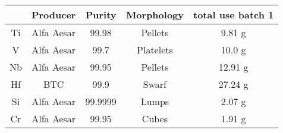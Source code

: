 \begin{tabular}{ccccc}
\toprule
{} &    Producer &   Purity & Morphology & total use batch 1 \\
\midrule
Ti &  Alfa Aesar &    99.98 &    Pellets &            9.81 g \\
V  &  Alfa Aesar &     99.7 &  Platelets &            10.0 g \\
Nb &  Alfa Aesar &    99.95 &    Pellets &           12.91 g \\
Hf &         BTC &     99.9 &      Swarf &           27.24 g \\
Si &  Alfa Aesar &  99.9999 &      Lumps &            2.07 g \\
Cr &  Alfa Aesar &    99.95 &      Cubes &            1.91 g \\
\bottomrule
\end{tabular}
